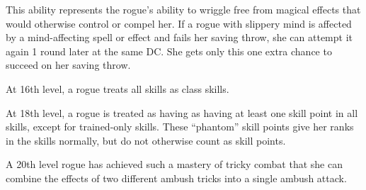  This ability represents the rogue's ability to wriggle free from magical effects that would otherwise control or compel her. If a rogue with slippery mind is affected by a mind-affecting spell or effect and fails her saving throw, she can attempt it again 1 round later at the same DC. She gets only this one extra chance to succeed on her saving throw.

 At 16th level, a rogue treats all skills as class skills.

 At 18th level, a rogue is treated as having as having at least one skill point in all skills, except for trained-only skills. These ``phantom'' skill points give her ranks in the skills normally, but do not otherwise count as skill points.

 A 20th level rogue has achieved such a mastery of tricky combat that she can combine the effects of two different ambush tricks into a single ambush attack.

